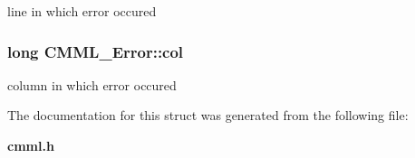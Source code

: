 line in which error occured 
\subsubsection{\setlength{\rightskip}{0pt plus 5cm}long {\bf CMML\_\-Error::col}}\label{structCMML__Error_o2}


column in which error occured 

The documentation for this struct was generated from the following file:\begin{CompactItemize}
\item 
{\bf cmml.h}\end{CompactItemize}
